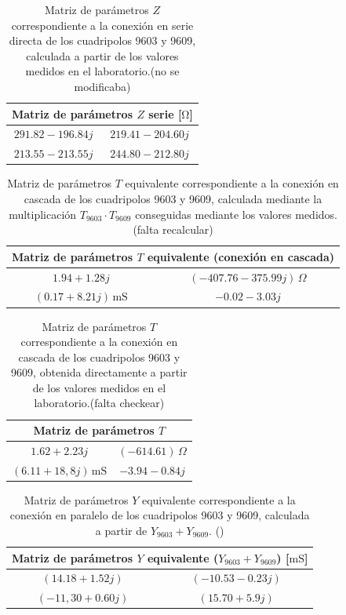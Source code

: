 \begin{table}[H]
\centering
\begin{tabular}{|c|c|}
\hline
\multicolumn{2}{|c|}{\textbf{Matriz de parámetros $Z$ serie [$\mathrm{\Omega}$]}} \\ \hline
$291.82 - 196.84j\,$ & $219.41 - 204.60j\,$ \\ \hline
$213.55 - 213.55j\,$ & $244.80 - 212.80j\,$ \\ \hline
\end{tabular}
\caption{Matriz de parámetros $Z$ correspondiente a la conexión en serie directa de los cuadripolos 9603 y 9609, calculada a partir de los valores medidos en el laboratorio.(no se modificaba)}
\label{tab:matriz_Z_serie_directa }
\end{table}

\begin{table}[H]
\centering
\begin{tabular}{|c|c|}
\hline
\multicolumn{2}{|c|}{\textbf{Matriz de parámetros $T$ equivalente (conexión en cascada)}} \\ \hline
$1.94 + 1.28j$ & $(-407.76 - 375.99j)\,\Omega$ \\ \hline
$(0.17 + 8.21j)\,\mathrm{mS}$ & $-0.02 - 3.03j$ \\ \hline
\end{tabular}
\caption{Matriz de parámetros $T$ equivalente correspondiente a la conexión en cascada de los cuadripolos 9603 y 9609, calculada mediante la multiplicación $T_{9603} \cdot T_{9609}$ conseguidas mediante los valores medidos.(falta recalcular)}
\label{tab:matriz_T_cascada_procuto}
\end{table}

\begin{table}[H]
\centering
\begin{tabular}{|c|c|}
\hline
\multicolumn{2}{|c|}{\textbf{Matriz de parámetros $T$ }} \\ \hline
$1.62 + 2.23j$ & $(-614.61)\,\Omega$ \\ \hline
$(6.11 + 18,8j)\,\mathrm{mS}$ & $-3.94 - 0.84j$ \\ \hline
\end{tabular}
\caption{Matriz de parámetros $T$ correspondiente a la conexión en cascada de los cuadripolos 9603 y 9609, obtenida directamente a partir de los valores medidos en el laboratorio.(falta checkear)}
\label{tab:matriz_T_cascada_directa}
\end{table}

\begin{table}[H]
\centering
\begin{tabular}{|c|c|}
\hline
\multicolumn{2}{|c|}{\textbf{Matriz de parámetros $Y$ equivalente ($Y_{9603} + Y_{9609}$) [$\mathrm{mS}$] }} \\ \hline
$(14.18 + 1.52j)\,$ & $(-10.53 - 0.23j)\,$ \\ \hline
$(-11,30 + 0.60j)\,$ & $(15.70 + 5.9j)\,$ \\ \hline
\end{tabular}
\caption{Matriz de parámetros $Y$ equivalente correspondiente a la conexión en paralelo de los cuadripolos 9603 y 9609, calculada a partir de $Y_{9603} + Y_{9609}$. ()}
\label{tab:matriz_Y_paralelo_suma}
\end{table}

